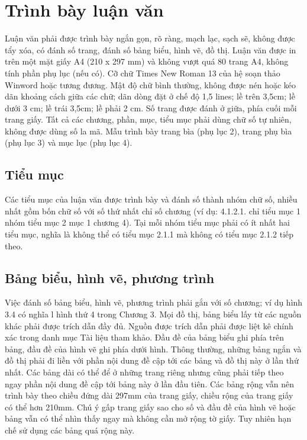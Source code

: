 \chapter{Trình bày luận văn}
\label{Chapter2}

Luận văn phải được trình bày ngắn gọn, rõ ràng, mạch lạc, sạch sẽ, không được tẩy xóa, có đánh số trang, đánh số bảng biểu, hình vẽ, đồ thị.
Luận văn được in trên một mặt giấy A4 (210 x 297 mm) và không vượt quá 80 trang A4, không tính phần phụ lục (nếu có).
Cỡ chữ Times New Roman 13 của hệ soạn thảo Winword hoặc tương đương.
Mật độ chữ bình thường, không được nén hoặc kéo dãn khoảng cách giữa các chữ; dãn dòng đặt ở chế độ 1,5 lines; lề trên 3,5cm; lề dưới 3 cm; lề trái 3,5cm; lề phải 2 cm.
Số trang được đánh ở giữa, phía cuối mỗi trang giấy.
Tất cả các chương, phần, mục, tiểu mục phải dùng chữ số tự nhiên, không được dùng số la mã.
Mẫu trình bày trang bìa (phụ lục 2), trang phụ bìa (phụ lục 3) và mục lục (phụ lục 4).

\section{Tiểu mục}

Các tiểu mục của luận văn được trình bày và đánh số thành nhóm chữ số, nhiều nhất gồm bốn chữ số với số thứ nhất chỉ số chương (ví dụ: 4.1.2.1. chỉ tiểu mục 1 nhóm tiểu mục 2 mục 1 chương 4).
Tại mỗi nhóm tiểu mục phải có ít nhất hai tiểu mục, nghĩa là không thể có tiểu mục 2.1.1 mà không có tiểu mục 2.1.2 tiếp theo.

\section{Bảng biểu, hình vẽ, phương trình}

Việc đánh số bảng biểu, hình vẽ, phương trình phải gắn với số chương; ví dụ hình 3.4 có nghĩa l hình thứ 4 trong Chương 3.
Mọi đồ thị, bảng biểu lấy từ các nguồn khác phải được trích dẫn đầy đủ. Nguồn được trích dẫn phải được liệt kê chính xác trong danh mục Tài liệu tham khảo.
Đầu đề của bảng biểu ghi phía trên bảng, đầu đề của hình vẽ ghi phía dưới hình.
Thông thường, những bảng ngắn và đồ thị phải đi liền với phần nội dung đề cập tới các bảng và đồ thị này ở lần thứ nhất.
Các bảng dài có thể để ở những trang riêng nhưng cũng phải tiếp theo ngay phần nội dung đề cập tới bảng này ở lần đầu tiên.
Các bảng rộng vẫn nên trình bày theo chiều đứng dài 297mm của trang giấy, chiều rộng của trang giấy có thể hơn 210mm.
Chú ý gấp trang giấy sao cho số và đầu đề của hình vẽ hoặc bảng vẫn có thể nhìn thấy ngay mà không cần mở rộng tờ giấy.
Tuy nhiên hạn chế sử dụng các bảng quá rộng này.

